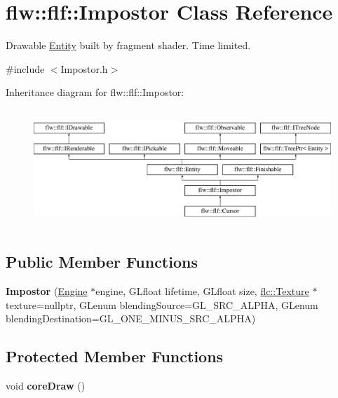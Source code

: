 \hypertarget{classflw_1_1flf_1_1Impostor}{}\section{flw\+:\+:flf\+:\+:Impostor Class Reference}
\label{classflw_1_1flf_1_1Impostor}


Drawable \hyperlink{classflw_1_1flf_1_1Entity}{Entity} built by fragment shader. Time limited.  




{\ttfamily \#include $<$Impostor.\+h$>$}

Inheritance diagram for flw\+:\+:flf\+:\+:Impostor\+:\begin{figure}[H]
\begin{center}
\leavevmode
\includegraphics[height=4.487180cm]{classflw_1_1flf_1_1Impostor}
\end{center}
\end{figure}
\subsection*{Public Member Functions}
\begin{DoxyCompactItemize}
\item 
{\bfseries Impostor} (\hyperlink{classflw_1_1Engine}{Engine} $\ast$engine, G\+Lfloat lifetime, G\+Lfloat size, \hyperlink{classflw_1_1flc_1_1Texture}{flc\+::\+Texture} $\ast$texture=nullptr, G\+Lenum blending\+Source=G\+L\+\_\+\+S\+R\+C\+\_\+\+A\+L\+P\+HA, G\+Lenum blending\+Destination=G\+L\+\_\+\+O\+N\+E\+\_\+\+M\+I\+N\+U\+S\+\_\+\+S\+R\+C\+\_\+\+A\+L\+P\+HA)\hypertarget{classflw_1_1flf_1_1Impostor_a8e3518ed91a20cc188b1a216add6154f}{}\label{classflw_1_1flf_1_1Impostor_a8e3518ed91a20cc188b1a216add6154f}

\end{DoxyCompactItemize}
\subsection*{Protected Member Functions}
\begin{DoxyCompactItemize}
\item 
void {\bfseries core\+Draw} ()\hypertarget{classflw_1_1flf_1_1Impostor_a29d7972ad45278d2c45f55d28206a0b3}{}\label{classflw_1_1flf_1_1Impostor_a29d7972ad45278d2c45f55d28206a0b3}

\end{DoxyCompactItemize}
